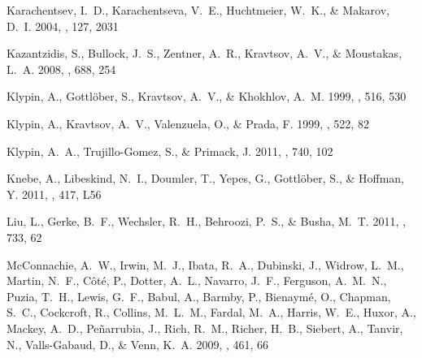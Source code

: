 \documentclass{emulateapj}
\begin{document}
\begin{thebibliography}{28}
{Karachentsev}, I.~D., {Karachentseva}, V.~E., {Huchtmeier}, W.~K., \&
  {Makarov}, D.~I. 2004, \aj, 127, 2031

{Kazantzidis}, S., {Bullock}, J.~S., {Zentner}, A.~R., {Kravtsov}, A.~V., \&
  {Moustakas}, L.~A. 2008, \apj, 688, 254

{Klypin}, A., {Gottl{\"o}ber}, S., {Kravtsov}, A.~V., \& {Khokhlov}, A.~M.
  1999{}, \apj, 516, 530

{Klypin}, A., {Kravtsov}, A.~V., {Valenzuela}, O., \& {Prada}, F.
  1999{}, \apj, 522, 82

{Klypin}, A.~A., {Trujillo-Gomez}, S., \& {Primack}, J. 2011, \apj, 740, 102

{Knebe}, A., {Libeskind}, N.~I., {Doumler}, T., {Yepes}, G., {Gottl{\"o}ber},
  S., \& {Hoffman}, Y. 2011, \mnras, 417, L56

{Liu}, L., {Gerke}, B.~F., {Wechsler}, R.~H., {Behroozi}, P.~S., \& {Busha},
  M.~T. 2011, \apj, 733, 62

{McConnachie}, A.~W., {Irwin}, M.~J., {Ibata}, R.~A., {Dubinski}, J., {Widrow},
  L.~M., {Martin}, N.~F., {C{\^o}t{\'e}}, P., {Dotter}, A.~L., {Navarro},
  J.~F., {Ferguson}, A.~M.~N., {Puzia}, T.~H., {Lewis}, G.~F., {Babul}, A.,
  {Barmby}, P., {Bienaym{\'e}}, O., {Chapman}, S.~C., {Cockcroft}, R.,
  {Collins}, M.~L.~M., {Fardal}, M.~A., {Harris}, W.~E., {Huxor}, A., {Mackey},
  A.~D., {Pe{\~n}arrubia}, J., {Rich}, R.~M., {Richer}, H.~B., {Siebert}, A.,
  {Tanvir}, N., {Valls-Gabaud}, D., \& {Venn}, K.~A. 2009, \nat, 461, 66


\end{thebibliography}
\end{document}
